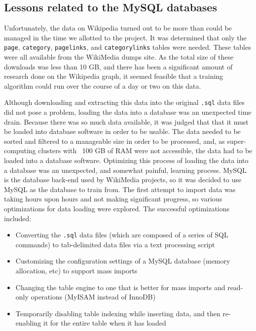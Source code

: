 \documentclass{article}
\begin{document}
\subsection{Lessons related to the MySQL databases}
Unfortunately, the data on Wikipedia turned out to be more than could be managed
in the time we allotted to the project. It was determined that only the
\texttt{page}, \texttt{category}, \texttt{pagelinks}, and \texttt{categorylinks}
tables were needed. These tables were all available from the WikiMedia dumps
site. As the total size of these downloads was less than 10 GB, and there has
been a significant amount of research done on the Wikipedia graph, it seemed
feasible that a training algorithm could run over the course of a day or two on
this data.

Although downloading and extracting this data into the original \texttt{.sql}
data files did not pose a problem, loading the data into a database was an
unexpected time drain. Because there was so much data available, it was judged
that that it must be loaded into database software in order to be usable. The
data needed to be sorted and filtered to a manageable size in order to be
processed, and, as super-computing clusters with ~100 GB of RAM were not
accessible, the data had to be loaded into a database software. Optimizing this
process of loading the data into a database was an unexpected, and somewhat
painful, learning process. MySQL is the database back-end used by WikiMedia
projects, so it was decided to use MySQL as the database to train from. The
first attempt to import data was taking hours upon hours and not making
significant progress, so various optimizations for data loading were explored.
The successful optimizations included:

\begin{itemize}
\item Converting the \texttt{.sql} data files (which are composed of a series of
  SQL commands) to tab-delimited data files via a text processing script
\item Customizing the configuration settings of a MySQL database (memory
  allocation, etc) to support mass imports
\item Changing the table engine to one that is better for mass imports and
  read-only operations (MyISAM instead of InnoDB)
\item Temporarily disabling table indexing while inserting data, and then
  re-enabling it for the entire table when it has loaded
\end{itemize}
\end{document}
